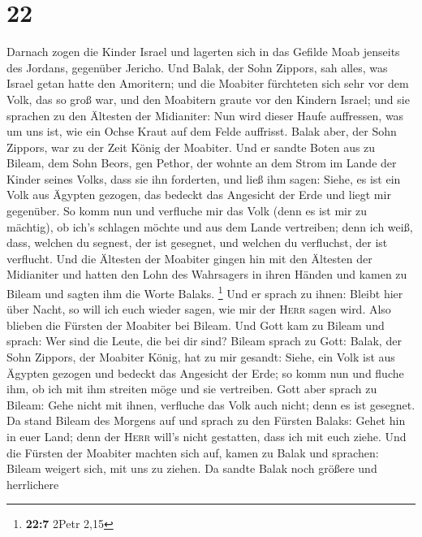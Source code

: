 \hypertarget{section-21}{%
\section{22}\label{section-21}}

 Darnach zogen die Kinder Israel und lagerten sich in das
Gefilde Moab jenseits des Jordans, gegenüber Jericho.  Und
Balak, der Sohn Zippors, sah alles, was Israel getan hatte den
Amoritern;  und die Moabiter fürchteten sich sehr vor dem
Volk, das so groß war, und den Moabitern graute vor den Kindern Israel;
 und sie sprachen zu den Ältesten der Midianiter: Nun wird
dieser Haufe auffressen, was um uns ist, wie ein Ochse Kraut auf dem
Felde auffrisst. Balak aber, der Sohn Zippors, war zu der Zeit König der
Moabiter.  Und er sandte Boten aus zu Bileam, dem Sohn
Beors, gen Pethor, der wohnte an dem Strom im Lande der Kinder seines
Volks, dass sie ihn forderten, und ließ ihm sagen: Siehe, es ist ein
Volk aus Ägypten gezogen, das bedeckt das Angesicht der Erde und liegt
mir gegenüber.  So komm nun und verfluche mir das Volk
(denn es ist mir zu mächtig), ob ich's schlagen möchte und aus dem Lande
vertreiben; denn ich weiß, dass, welchen du segnest, der ist gesegnet,
und welchen du verfluchst, der ist verflucht.  Und die
Ältesten der Moabiter gingen hin mit den Ältesten der Midianiter und
hatten den Lohn des Wahrsagers in ihren Händen und kamen zu Bileam und
sagten ihm die Worte Balaks. \footnote{\textbf{22:7} 2Petr 2,15}
 Und er sprach zu ihnen: Bleibt hier über Nacht, so will
ich euch wieder sagen, wie mir der \textsc{Herr} sagen wird. Also
blieben die Fürsten der Moabiter bei Bileam.  Und Gott kam
zu Bileam und sprach: Wer sind die Leute, die bei dir sind?
 Bileam sprach zu Gott: Balak, der Sohn Zippors, der
Moabiter König, hat zu mir gesandt:  Siehe, ein Volk ist
aus Ägypten gezogen und bedeckt das Angesicht der Erde; so komm nun und
fluche ihm, ob ich mit ihm streiten möge und sie vertreiben.
 Gott aber sprach zu Bileam: Gehe nicht mit ihnen,
verfluche das Volk auch nicht; denn es ist gesegnet.  Da
stand Bileam des Morgens auf und sprach zu den Fürsten Balaks: Gehet hin
in euer Land; denn der \textsc{Herr} will's nicht gestatten, dass ich
mit euch ziehe.  Und die Fürsten der Moabiter machten
sich auf, kamen zu Balak und sprachen: Bileam weigert sich, mit uns zu
ziehen.  Da sandte Balak noch größere und herrlichere

